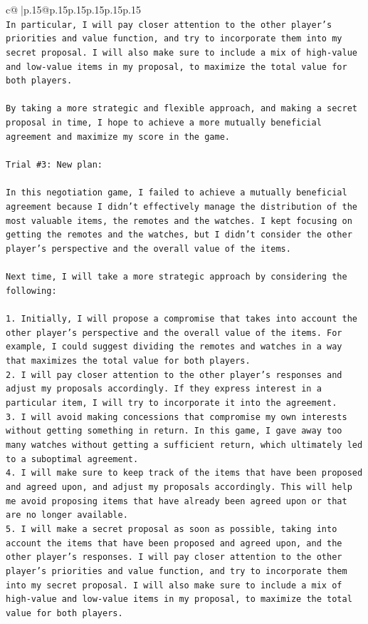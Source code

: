 \documentclass{article}
\begin{document}
{\begin{supertabular}{c@{$\;$}|p{.15\linewidth}@{}p{.15\linewidth}p{.15\linewidth}p{.15\linewidth}p{.15\linewidth}p{.15\linewidth}}
{{{\\ 
\texttt{In particular, I will pay closer attention to the other player's priorities and value function, and try to incorporate them into my secret proposal. I will also make sure to include a mix of high{-}value and low{-}value items in my proposal, to maximize the total value for both players.} \\
\\ 
\texttt{By taking a more strategic and flexible approach, and making a secret proposal in time, I hope to achieve a more mutually beneficial agreement and maximize my score in the game.} \\
\\ 
\texttt{Trial \#3: New plan: } \\
\\ 
\texttt{In this negotiation game, I failed to achieve a mutually beneficial agreement because I didn't effectively manage the distribution of the most valuable items, the remotes and the watches. I kept focusing on getting the remotes and the watches, but I didn't consider the other player's perspective and the overall value of the items.} \\
\\ 
\texttt{Next time, I will take a more strategic approach by considering the following:} \\
\\ 
\texttt{1.  Initially, I will propose a compromise that takes into account the other player's perspective and the overall value of the items. For example, I could suggest dividing the remotes and watches in a way that maximizes the total value for both players.} \\
\texttt{2.  I will pay closer attention to the other player's responses and adjust my proposals accordingly. If they express interest in a particular item, I will try to incorporate it into the agreement.} \\
\texttt{3.  I will avoid making concessions that compromise my own interests without getting something in return. In this game, I gave away too many watches without getting a sufficient return, which ultimately led to a suboptimal agreement.} \\
\texttt{4.  I will make sure to keep track of the items that have been proposed and agreed upon, and adjust my proposals accordingly. This will help me avoid proposing items that have already been agreed upon or that are no longer available.} \\
\texttt{5.  I will make a secret proposal as soon as possible, taking into account the items that have been proposed and agreed upon, and the other player's responses. I will pay closer attention to the other player's priorities and value function, and try to incorporate them into my secret proposal. I will also make sure to include a mix of high{-}value and low{-}value items in my proposal, to maximize the total value for both players.} \\
}}}
\end{supertabular}}
\end{document}

